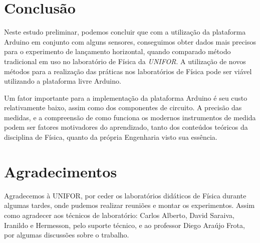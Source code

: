 \documentclass[article,11pt,a4paper]{abntex2}
\begin{document}
\section{Conclusão}

Neste estudo preliminar, podemos concluir que
com a utilização da plataforma Arduino em conjunto com alguns sensores, conseguimos obter dados mais precisos para o experimento de lançamento horizontal, quando comparado método tradicional em uso no laboratório de Física da \emph{UNIFOR}.
A utilização de novos métodos para a realização das práticas nos laboratórios de Física pode ser viável utilizando a plataforma livre Arduino.

Um fator importante para a implementação da plataforma Arduino é seu custo relativamente baixo, assim como dos componentes de circuito.
A precisão das medidas, e a compreensão de como funciona os modernos instrumentos de medida podem ser fatores motivadores do aprendizado, tanto dos conteúdos teóricos da disciplina de Física, quanto da própria Engenharia visto sua essência.




\section{Agradecimentos}

Agradecemos à UNIFOR, por ceder os laboratórios didáticos de Física durante algumas tardes, onde pudemos realizar reuniões e montar os experimentos.
Assim como agradecer aos técnicos de laboratório: Carlos Alberto, David Saraiva, Iranildo e Hermesson, pelo suporte técnico, e ao professor Diego Araújo Frota, por algumas discussões sobre o trabalho.



\printbibliography{}




\end{document}
